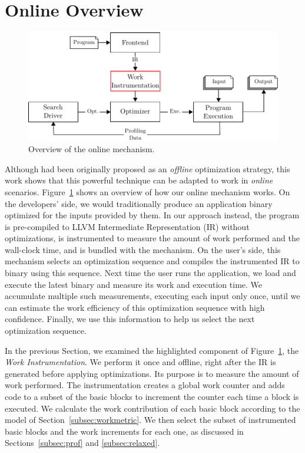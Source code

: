 \section{Online {\IterComp} Overview} \label{sec:oic-infra}

    \begin{figure}[t]
        \centering
        \includegraphics[width=\linewidth]{figs/infra-diagram}
        \caption{Overview of the online \itercomp mechanism.}
        \label{fig:infra-diagram}
    \end{figure}

    Although {\itercomp} had been originally proposed as an \textit{offline} optimization strategy, this work shows that this powerful
    technique can be adapted to work in \textit{online} scenarios. Figure~\ref{fig:infra-diagram} shows an overview of how our online
    {\itercomp} mechanism works. On the developers' side, we would traditionally produce an application binary optimized for the inputs
    provided by them. In our approach instead, the program is pre-compiled to LLVM Intermediate Representation (IR) without optimizations,
    is instrumented to measure the amount of work performed and the wall-clock time, and is bundled with the {\itercomp} mechanism.
    On the user's side, this mechanism selects an optimization sequence and compiles the instrumented IR to binary using this sequence.
    Next time the user runs the application, we load and execute the latest binary and measure its work and execution time. We accumulate
    multiple such measurements, executing each input only once, until we can estimate the work efficiency of this optimization sequence
    with high confidence. Finally, we use this information to help us select the next optimization sequence.
    
    In the previous Section, we examined the highlighted component of Figure~\ref{fig:infra-diagram}, the \textit{Work Instrumentation}.
    We perform it once and offline, right after the IR is generated before applying optimizations. Its purpose is to measure the amount of
    work performed. The instrumentation creates a global work counter and adds code to a subset of the basic blocks to increment the counter
    each time a block is executed. We calculate the work contribution of each basic block according to the model of Section~\ref{subsec:workmetric}.
    We then select the subset of instrumented basic blocks and the work increments for each one, as discussed in Sections~\ref{subsec:prof}
    and \ref{subsec:relaxed}.
    
